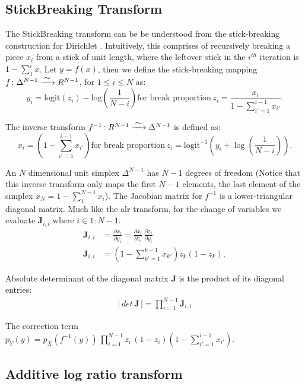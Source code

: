 \documentclass[11pt]{article}
\newcommand{\abs}[1]{\left| #1 \right|}
\begin{document}
\subsection{StickBreaking Transform}

The StickBreaking transform can be be understood from the stick-breaking construction for Dirichlet \cite{sethurman}. Intuitively, this comprises of recursively breaking a piece $x_i$ from a stick of unit length, where the leftover stick in the $i^{th}$ iteration is $ 1 - \sum_{1}^{i}x$. Let $y = f(x)$, then we define the stick-breaking mapping $ f \colon \Delta^{N-1} \xrightarrow{\makebox[0.4cm]{$\sim$}}  R^{N-1}$, for $1 \leq i \leq N$ as:	
\[
y_i
= \mathrm{logit}(z_i) - \mbox{log}\left(\frac{1}{N-i}
   \right) \text{for break proportion} \, 
   z_i = \frac{x_i}{1 - \sum_{i' = 1}^{i-1} x_{i'}}.
\]

The inverse transform $ f^{-1} \colon R^{N-1} \xrightarrow{\makebox[0.4cm]{$\sim$}}  \Delta^{N-1}$ is defined as:
\[
x_i =
\left( 1 - \sum_{i'=1}^{i-1} x_{i'} \right) \text{for break proportion} \, z_i = \mathrm{logit}^{-1} \left( y_i
                             + \log \left( \frac{1}{N - i}
                                            \right)\right).
                                            \]
                            
An $N$ dimensional unit simplex $\Delta^{N-1}$ has $N-1$ degrees of freedom (Notice that this inverse transform only maps the first $N-1$ elements, the last element of the simplex $x_{N} = 1 - \sum_1^{N-1}{x_i}$). The Jacobian matrix for $f^{-1}$ is a lower-triangular diagonal matrix. Much like the alr transform, for the change of variables we evaluate $\mathbf{J}_{i, i}$ where $i \in 1:N-1$.
\begin{align*}
\mathbf{J}_{i, i} &= \frac{\partial x_i}{\partial y_i}
=
\frac{\partial x_i}{\partial z_i} \,
\frac{\partial z_i}{\partial y_i}\\
\mathbf{J}_{i, i} &= \left(
  1 - \sum_{k' = 1}^{k-1} x_{k'}
   \right) z_k (1 - z_k),
\end{align*}

Absolute determinant of the diagonal matrix $\mathbf{J}$ is the product of its diagonal entries:
\begin{align*}
	\abs{\, det \, \textbf{J} \,} = \prod_{i=1}^{N-1} \textbf{J}_{i,i}
\end{align*}

The correction term $p_Y(y) = p_X(f^{-1}(y))\,
\prod_{i=1}^{N-1}z_i\,(1 - z_i)\left(1 - \sum_{i'=1}^{i-1} x_{i'}\right).$
\subsection{Additive log ratio transform}
\end{document}
